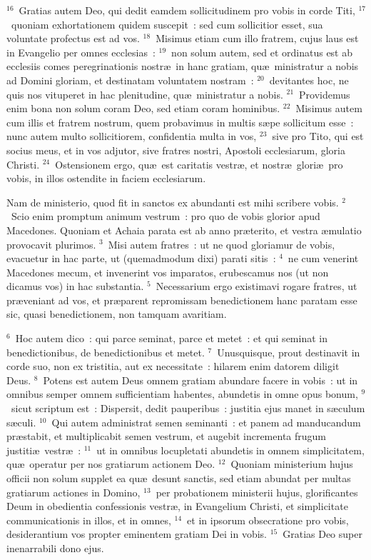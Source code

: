 ${}^{16}$~Gratias autem Deo, qui dedit eamdem sollicitudinem pro vobis in corde Titi,
${}^{17}$~quoniam exhortationem quidem suscepit~: sed cum sollicitior esset, sua voluntate profectus est ad vos.
${}^{18}$~Misimus etiam cum illo fratrem, cujus laus est in Evangelio per omnes ecclesias~:
${}^{19}$~non solum autem, sed et ordinatus est ab ecclesiis comes peregrinationis nostr\ae\ in hanc gratiam, qu\ae\ ministratur a nobis ad Domini gloriam, et destinatam voluntatem nostram~:
${}^{20}$~devitantes hoc, ne quis nos vituperet in hac plenitudine, qu\ae\ ministratur a nobis.
${}^{21}$~Providemus enim bona non solum coram Deo, sed etiam coram hominibus.
${}^{22}$~Misimus autem cum illis et fratrem nostrum, quem probavimus in multis s\ae pe sollicitum esse~: nunc autem multo sollicitiorem, confidentia multa in vos,
${}^{23}$~sive pro Tito, qui est socius meus, et in vos adjutor, sive fratres nostri, Apostoli ecclesiarum, gloria Christi.
${}^{24}$~Ostensionem ergo, qu\ae\ est caritatis vestr\ae , et nostr\ae\ glori\ae\ pro vobis, in illos ostendite in faciem ecclesiarum.

\bchapter
\lettrine[lines=3,image=true,loversize=0.05,lraise=-0.03]{N}{}am de ministerio, quod fit in sanctos ex abundanti est mihi scribere vobis.
${}^{2}$~Scio enim promptum animum vestrum~: pro quo de vobis glorior apud Macedones. Quoniam et Achaia parata est ab anno pr\ae terito, et vestra \ae mulatio provocavit plurimos.
${}^{3}$~Misi autem fratres~: ut ne quod gloriamur de vobis, evacuetur in hac parte, ut (quemadmodum dixi) parati sitis~:
${}^{4}$~ne cum venerint Macedones mecum, et invenerint vos imparatos, erubescamus nos (ut non dicamus vos) in hac substantia.
${}^{5}$~Necessarium ergo existimavi rogare fratres, ut pr\ae veniant ad vos, et pr\ae parent repromissam benedictionem hanc paratam esse sic, quasi benedictionem, non tamquam avaritiam.


${}^{6}$~Hoc autem dico~: qui parce seminat, parce et metet~: et qui seminat in benedictionibus, de benedictionibus et metet.
${}^{7}$~Unusquisque, prout destinavit in corde suo, non ex tristitia, aut ex necessitate~: hilarem enim datorem diligit Deus.
${}^{8}$~Potens est autem Deus omnem gratiam abundare facere in vobis~: ut in omnibus semper omnem sufficientiam habentes, abundetis in omne opus bonum,
${}^{9}$~sicut scriptum est~: Dispersit, dedit pauperibus~: justitia ejus manet in s\ae culum s\ae culi.
${}^{10}$~Qui autem administrat semen seminanti~: et panem ad manducandum pr\ae stabit, et multiplicabit semen vestrum, et augebit incrementa frugum justiti\ae\ vestr\ae~:
${}^{11}$~ut in omnibus locupletati abundetis in omnem simplicitatem, qu\ae\ operatur per nos gratiarum actionem Deo.
${}^{12}$~Quoniam ministerium hujus officii non solum supplet ea qu\ae\ desunt sanctis, sed etiam abundat per multas gratiarum actiones in Domino,
${}^{13}$~per probationem ministerii hujus, glorificantes Deum in obedientia confessionis vestr\ae , in Evangelium Christi, et simplicitate communicationis in illos, et in omnes,
${}^{14}$~et in ipsorum obsecratione pro vobis, desiderantium vos propter eminentem gratiam Dei in vobis.
${}^{15}$~Gratias Deo super inenarrabili dono ejus.

